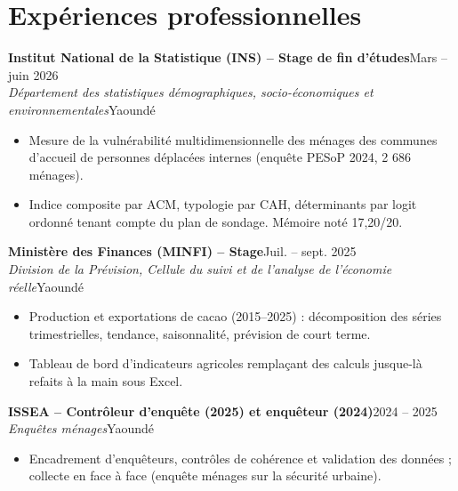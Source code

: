 \documentclass[10pt,a4paper]{article}
\newcommand{\entry}[4]{\textbf{#1}\hfill{\small\color{muted}#2}\\{\itshape #3}\hfill{\small\color{muted}#4}\par}
\begin{document}
\section{Exp\'eriences professionnelles}
\entry{Institut National de la Statistique (INS) -- Stage de fin d'\'etudes}{Mars -- juin 2026}{D\'epartement des statistiques d\'emographiques, socio-\'economiques et environnementales}{Yaound\'e}
\begin{itemize}
\item Mesure de la vuln\'erabilit\'e multidimensionnelle des m\'enages des communes d'accueil de personnes d\'eplac\'ees internes (enqu\^ete PESoP 2024, 2 686 m\'enages).
\item Indice composite par ACM, typologie par CAH, d\'eterminants par logit ordonn\'e tenant compte du plan de sondage. M\'emoire not\'e 17,20/20.
\end{itemize}
\vspace{2pt}
\entry{Minist\`ere des Finances (MINFI) -- Stage}{Juil. -- sept. 2025}{Division de la Pr\'evision, Cellule du suivi et de l'analyse de l'\'economie r\'eelle}{Yaound\'e}
\begin{itemize}
\item Production et exportations de cacao (2015--2025) : d\'ecomposition des s\'eries trimestrielles, tendance, saisonnalit\'e, pr\'evision de court terme.
\item Tableau de bord d'indicateurs agricoles rempla\c{c}ant des calculs jusque-l\`a refaits \`a la main sous Excel.
\end{itemize}
\vspace{2pt}
\entry{ISSEA -- Contr\^oleur d'enqu\^ete (2025) et enqu\^eteur (2024)}{2024 -- 2025}{Enqu\^etes m\'enages}{Yaound\'e}
\begin{itemize}
\item Encadrement d'enqu\^eteurs, contr\^oles de coh\'erence et validation des donn\'ees ; collecte en face \`a face (enqu\^ete m\'enages sur la s\'ecurit\'e urbaine).
\end{itemize}
\end{document}

